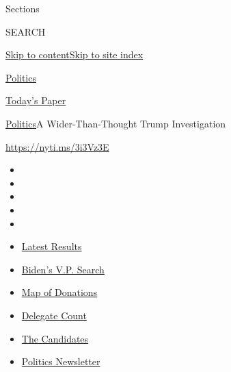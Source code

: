 Sections

SEARCH

\protect\hyperlink{site-content}{Skip to
content}\protect\hyperlink{site-index}{Skip to site index}

\href{https://www.nytimes.com/section/politics}{Politics}

\href{https://myaccount.nytimes.com/auth/login?response_type=cookie\&client_id=vi}{}

\href{https://www.nytimes.com/section/todayspaper}{Today's Paper}

\href{/section/politics}{Politics}\textbar{}A Wider-Than-Thought Trump
Investigation

\url{https://nyti.ms/3i3Vz3E}

\begin{itemize}
\item
\item
\item
\item
\item
\end{itemize}

\begin{itemize}
\item
  \href{https://www.nytimes.com/interactive/2020/08/04/us/elections/results-arizona-kansas-michigan-missouri-primaries.html?action=click\&pgtype=Article\&state=default\&region=TOP_BANNER\&context=storylines_menu}{Latest
  Results}
\item
  \href{https://www.nytimes.com/article/biden-vice-president-2020.html?action=click\&pgtype=Article\&state=default\&region=TOP_BANNER\&context=storylines_menu}{Biden's
  V.P. Search}
\item
  \href{https://www.nytimes.com/interactive/2020/07/24/us/politics/trump-biden-campaign-donors.html?action=click\&pgtype=Article\&state=default\&region=TOP_BANNER\&context=storylines_menu}{Map
  of Donations}
\item
  \href{https://www.nytimes.com/interactive/2020/us/elections/delegate-count-primary-results.html?action=click\&pgtype=Article\&state=default\&region=TOP_BANNER\&context=storylines_menu}{Delegate
  Count}
\item
  \href{https://www.nytimes.com/interactive/2019/us/politics/2020-presidential-candidates.html?action=click\&pgtype=Article\&state=default\&region=TOP_BANNER\&context=storylines_menu}{The
  Candidates}
\item
  \href{https://www.nytimes.com/newsletters/politics?action=click\&pgtype=Article\&state=default\&region=TOP_BANNER\&context=storylines_menu}{Politics
  Newsletter}
\end{itemize}

